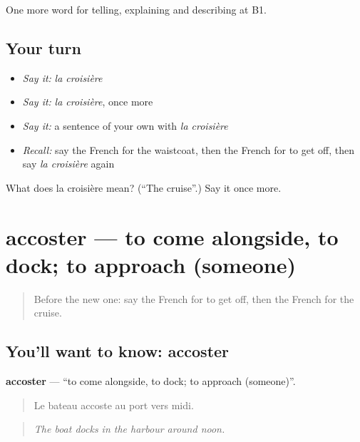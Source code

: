 \begin{grammarlens}[title={What you've built}]
One more word for telling, explaining and describing at B1.
\end{grammarlens}

\subsection*{Your turn}
\begin{itemize}
\raggedright
  \item \emph{Say it:} \emph{la croisière}
  \item \emph{Say it:} \emph{la croisière}, once more
  \item \emph{Say it:} a sentence of your own with \emph{la croisière}
  \item \emph{Recall:} say the French for the waistcoat, then the French for to get off, then say \emph{la croisière} again
\end{itemize}

\begin{tcolorbox}[breakable,colback=teal!4,colframe=teal!35!black,title={Before you move on}]
What does la croisière mean? (\textquotedblleft{}The cruise\textquotedblright{}.) Say it once more.
\end{tcolorbox}
\section[accoster]{accoster — to come alongside, to dock; to approach (someone)}

\label{lesson:FR-C423-accoster}



\begin{quote}
Before the new one: say the French for to get off, then the French for the cruise.
\end{quote}

\subsection*{You'll want to know: accoster}
\textbf{accoster} — \textquotedblleft{}to come alongside, to dock; to approach (someone)\textquotedblright{}.

\begin{quote}
Le bateau accoste au port vers midi.
\end{quote}

\begin{quote}
\emph{The boat docks in the harbour around noon.}
\end{quote}

